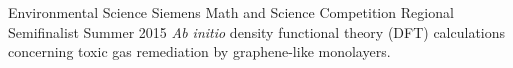 
\begin{cventries}

  \cventry
    {Environmental Science} %
    {Siemens Math and Science Competition} %
    {Regional Semifinalist} %
    {Summer 2015} %
    {
      {\textit{Ab initio}} density functional theory (DFT) calculations concerning toxic gas remediation by graphene-like
monolayers.
    }

\end{cventries}
